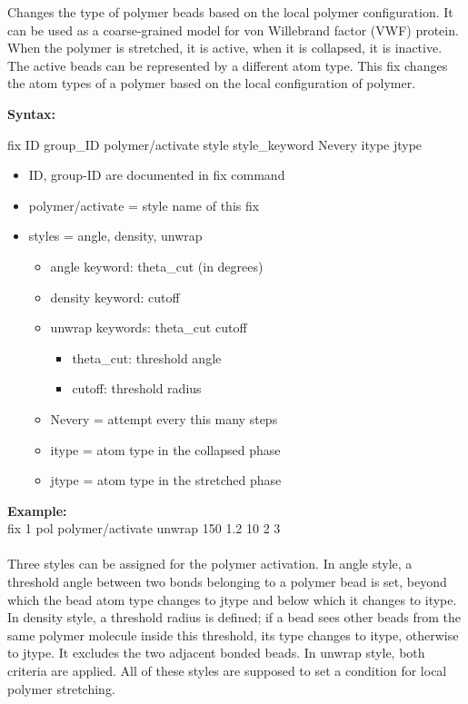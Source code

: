   Changes the type of polymer beads based on the local polymer configuration. It can be used as a coarse-grained model for von Willebrand factor (VWF) protein. When the polymer is stretched, it is active, when it is collapsed, it is inactive. The active beads can be represented by a different atom type. This fix changes the atom types of a polymer based on the local configuration of polymer. 

{\bfseries Syntax:}

fix ID group\_ID polymer/activate style style\_keyword Nevery itype jtype

\begin{itemize}

  \item ID, group-ID are documented in fix command

  \item polymer/activate = style name of this fix

  \item styles = angle, density, unwrap

  \begin{itemize}

    \item angle keyword: theta\_cut (in degrees)

    \item density keyword: cutoff

    \item unwrap keywords: theta\_cut  cutoff

    \begin{itemize}

      \item theta\_cut: threshold angle

      \item cutoff: threshold radius

    \end{itemize}

  \item Nevery = attempt every this many steps

  \item itype = atom type in the collapsed phase

  \item jtype = atom type in the stretched phase

  \end{itemize}

\end{itemize}

\textbf{Example:}\\
fix 1 pol polymer/activate unwrap 150 1.2 10 2 3
\\ \\
  Three styles can be assigned for the polymer activation. In angle style, a threshold angle between two bonds belonging to a polymer bead is set, beyond which the bead atom type changes to jtype and below which it changes to itype. In density style, a threshold radius is defined; if a bead sees other beads from the same polymer molecule inside this threshold, its type changes to itype, otherwise to jtype. It excludes the two adjacent bonded beads. In unwrap style, both criteria are applied. All of these styles are supposed to set a condition for local polymer stretching.

